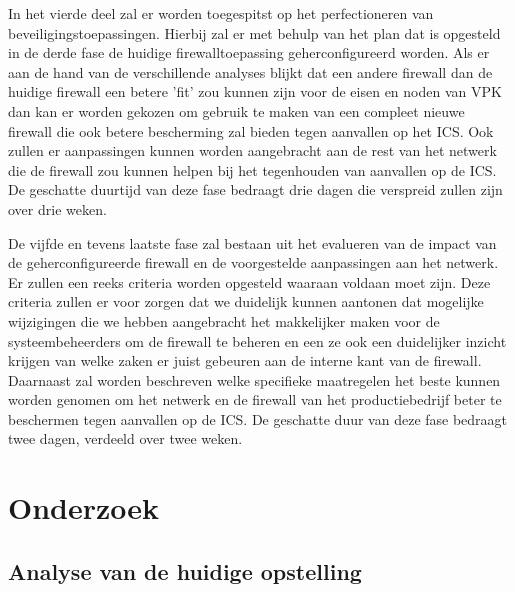 In het vierde deel zal er worden toegespitst op het perfectioneren van beveiligingstoepassingen. Hierbij zal er met behulp van het plan dat is opgesteld in de derde fase de huidige firewalltoepassing geherconfigureerd worden. Als er aan de hand van de verschillende analyses blijkt dat een andere firewall dan de huidige firewall een betere 'fit' zou kunnen zijn voor de eisen en noden van VPK dan kan er worden gekozen om gebruik te maken van een compleet nieuwe firewall die ook betere bescherming zal bieden tegen aanvallen op het ICS. Ook zullen er aanpassingen kunnen worden aangebracht aan de rest van het netwerk die de firewall zou kunnen helpen bij het tegenhouden van aanvallen op de ICS. De geschatte duurtijd van deze fase bedraagt drie dagen die verspreid zullen zijn over drie weken.

De vijfde en tevens laatste fase zal bestaan uit het evalueren van de impact van de geherconfigureerde firewall en de voorgestelde aanpassingen aan het netwerk. Er zullen een reeks criteria worden opgesteld waaraan voldaan moet zijn. Deze criteria zullen er voor zorgen dat we duidelijk kunnen aantonen dat mogelijke wijzigingen die we hebben aangebracht het makkelijker maken voor de systeembeheerders om de firewall te beheren en een ze ook een duidelijker inzicht krijgen van welke zaken er juist gebeuren aan de interne kant van de firewall. Daarnaast zal worden beschreven welke specifieke maatregelen het beste kunnen worden genomen om het netwerk en de firewall van het productiebedrijf beter te beschermen tegen aanvallen op de ICS. De geschatte duur van deze fase bedraagt twee dagen, verdeeld over twee weken.  

\chapter{Onderzoek}

\label{ch:onderzoek}

\section{Analyse van de huidige opstelling}

